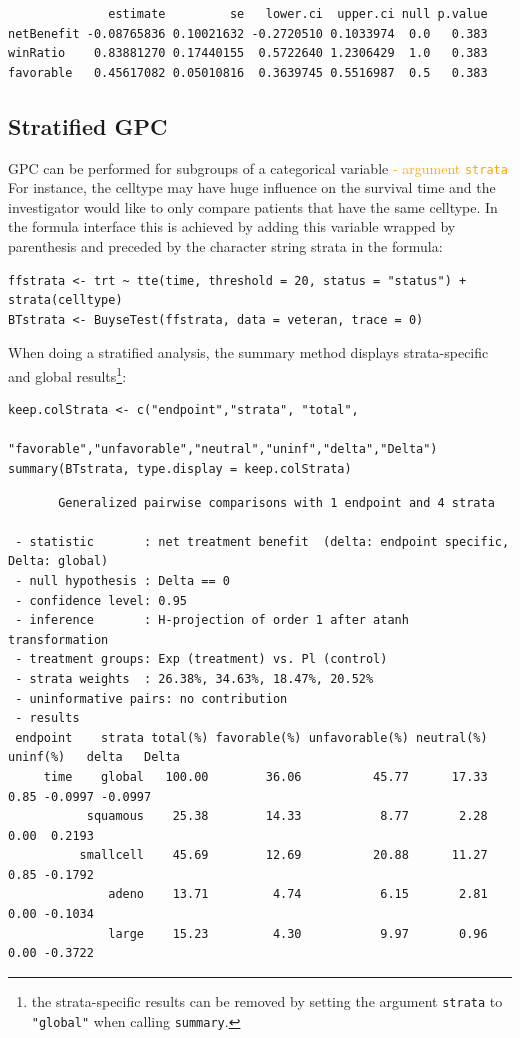 \documentclass[12pt]{article}
\begin{document}
\begin{verbatim}
              estimate         se   lower.ci  upper.ci null p.value
netBenefit -0.08765836 0.10021632 -0.2720510 0.1033974  0.0   0.383
winRatio    0.83881270 0.17440155  0.5722640 1.2306429  1.0   0.383
favorable   0.45617082 0.05010816  0.3639745 0.5516987  0.5   0.383
\end{verbatim}


\clearpage

\subsection{Stratified GPC}
\label{sec:org7db1385}

GPC can be performed for subgroups of a categorical variable \hfill
\textcolor{orange}{- argument \texttt{strata}} \newline For
instance, the celltype may have huge influence on the survival time
and the investigator would like to only compare patients that have the
same celltype. In the formula interface this is achieved by adding this
variable wrapped by parenthesis and preceded by the character string
strata in the formula:
\lstset{language=r,label= ,caption= ,captionpos=b,numbers=none}
\begin{lstlisting}
ffstrata <- trt ~ tte(time, threshold = 20, status = "status") + strata(celltype)
BTstrata <- BuyseTest(ffstrata, data = veteran, trace = 0)
\end{lstlisting}

When doing a stratified analysis, the summary method displays
strata-specific and global results\footnote{the strata-specific results can
be removed by setting the argument \texttt{strata} to \texttt{"global"} when calling
\texttt{summary}.}:
\lstset{language=r,label= ,caption= ,captionpos=b,numbers=none}
\begin{lstlisting}
keep.colStrata <- c("endpoint","strata", "total",
                    "favorable","unfavorable","neutral","uninf","delta","Delta")
summary(BTstrata, type.display = keep.colStrata)
\end{lstlisting}

\begin{verbatim}
       Generalized pairwise comparisons with 1 endpoint and 4 strata

 - statistic       : net treatment benefit  (delta: endpoint specific, Delta: global) 
 - null hypothesis : Delta == 0 
 - confidence level: 0.95 
 - inference       : H-projection of order 1 after atanh transformation 
 - treatment groups: Exp (treatment) vs. Pl (control) 
 - strata weights  : 26.38%, 34.63%, 18.47%, 20.52% 
 - uninformative pairs: no contribution
 - results
 endpoint    strata total(%) favorable(%) unfavorable(%) neutral(%) uninf(%)   delta   Delta
     time    global   100.00        36.06          45.77      17.33     0.85 -0.0997 -0.0997
           squamous    25.38        14.33           8.77       2.28     0.00  0.2193        
          smallcell    45.69        12.69          20.88      11.27     0.85 -0.1792        
              adeno    13.71         4.74           6.15       2.81     0.00 -0.1034        
              large    15.23         4.30           9.97       0.96     0.00 -0.3722
\end{verbatim}
\end{document}

